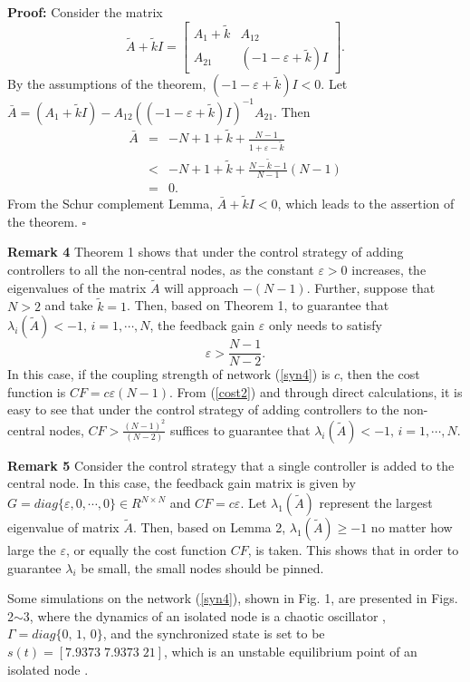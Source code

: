 \documentclass[11pt]{article}
\def\dref#1{(\ref{#1})}
\begin{document}
{\bf Proof:} Consider the matrix
$$
 \tilde{A}+\tilde{k}I=\left[\begin{array}{cc}
 A_1+\tilde{k} &  A_{12}  \\
 A_{21}  &  (-1-\varepsilon+\tilde{k})I
\end{array}\right].
$$
By the assumptions of the theorem, $(-1-\varepsilon+\tilde{k})I<0$.
Let
$\bar{A}=(A_1+\tilde{k}I)-A_{12}((-1-\varepsilon+\tilde{k})I)^{-1}A_{21}.$
Then
$$
 \begin{array}{ccl}
 \bar{A} & = & -N+1+\tilde{k}+\frac{N-1}{1+\varepsilon-\tilde{k}} \\
   & < & -N+1+\tilde{k}+\frac{N-\tilde{k}-1}{N-1}(N-1) \\
   & = & 0. \end{array}
$$
From the Schur complement Lemma, $\bar{A}+\tilde{k}I<0$, which leads
to the assertion of the theorem. \hfill $\square$

\textbf {Remark 4} Theorem 1 shows that under the control strategy
of adding controllers to all the non-central nodes, as the constant
$\varepsilon>0$ increases, the eigenvalues of the matrix $\tilde{A}$
will approach $-(N-1)$. Further, suppose that $N>2$ and take
$\tilde{k}=1$. Then, based on Theorem 1, to guarantee that
$\lambda_i(\tilde{A})<-1,\,i=1,\cdots,N$, the feedback
 gain $\varepsilon$ only needs to satisfy
\begin{equation}\label{cost2}
\varepsilon>\frac{N-1}{N-2}.
\end{equation}
In this case, if the coupling strength of network \dref{syn4} is
$c$, then the cost function is $CF=c\varepsilon(N-1)$. From
\dref{cost2} and through direct calculations, it is easy to see that
under the control strategy of adding controllers to the non-central
nodes, $CF>\frac{(N-1)^2}{(N-2)}$ suffices to guarantee that
$\lambda_i(\tilde{A})<-1,\,i=1,\cdots,N$.

\textbf {Remark 5} Consider the control strategy that a single
controller is added to the central node. In this case, the feedback
gain matrix is given by $G=diag\{\varepsilon,0,\cdots,0\}\in
R^{N\times N}$ and $CF=c\varepsilon$. Let $\lambda_1(\tilde{A})$
represent the largest eigenvalue of matrix $\tilde{A}$. Then, based
on Lemma 2, $\lambda_1(\tilde{A})\geq-1$ no matter how large the
$\varepsilon$, or equally the cost function $CF$, is taken. This
shows that in order to guarantee $\lambda_i$ be small, the small
nodes should be pinned.

Some simulations on the network \dref{syn4}, shown in Fig. 1, are
presented in Figs. 2$\sim$3, where the dynamics of an isolated node
is a chaotic oscillator \cite{r9}, $\Gamma=diag\{0,\,1,\,0\}$, and
the synchronized state is set to be $s(t)=[7.9373\;7.9373\;21]$,
which is an unstable equilibrium point of an isolated node
\cite{r10}.
\end{document}
